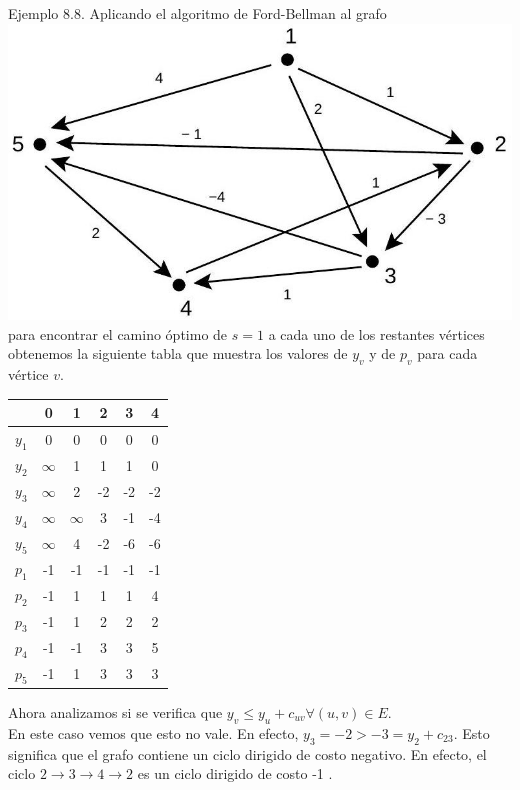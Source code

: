 \documentclass[10pt]{article}
\begin{document}
Ejemplo 8.8. Aplicando el algoritmo de Ford-Bellman al grafo\\
\includegraphics[max width=\textwidth, center]{2025_09_05_93c7c1835f249f70c0eeg-35}\\
para encontrar el camino óptimo de $s=1$ a cada uno de los restantes vértices obtenemos la siguiente tabla que muestra los valores de $y_{v}$ y de $p_{v}$ para cada vértice $v$.

\begin{center}
\begin{tabular}{|c|c|c|c|c|c|}
\hline
 & 0 & 1 & 2 & 3 & 4 \\
\hline
$y_{1}$ & 0 & 0 & 0 & 0 & 0 \\
\hline
$y_{2}$ & $\infty$ & 1 & 1 & 1 & 0 \\
\hline
$y_{3}$ & $\infty$ & 2 & -2 & -2 & -2 \\
\hline
$y_{4}$ & $\infty$ & $\infty$ & 3 & -1 & -4 \\
\hline
$y_{5}$ & $\infty$ & 4 & -2 & -6 & -6 \\
\hline
$p_{1}$ & -1 & -1 & -1 & -1 & -1 \\
\hline
$p_{2}$ & -1 & 1 & 1 & 1 & 4 \\
\hline
$p_{3}$ & -1 & 1 & 2 & 2 & 2 \\
\hline
$p_{4}$ & -1 & -1 & 3 & 3 & 5 \\
\hline
$p_{5}$ & -1 & 1 & 3 & 3 & 3 \\
\hline
\end{tabular}
\end{center}

Ahora analizamos si se verifica que $y_{v} \leq y_{u}+c_{u v} \forall(u, v) \in E$.\\
En este caso vemos que esto no vale. En efecto, $y_{3}=-2>-3=y_{2}+c_{23}$. Esto significa que el grafo contiene un ciclo dirigido de costo negativo. En efecto, el ciclo $2 \longrightarrow 3 \longrightarrow 4 \longrightarrow 2$ es un ciclo dirigido de costo -1 .
\end{document}
